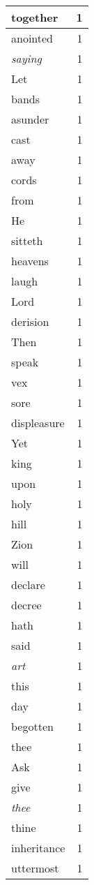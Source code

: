 \begin{center}
\begin{longtable}{l|r}
together & 1 \\ \hline
anointed & 1 \\ \hline
\emph{saying} & 1 \\ \hline
Let & 1 \\ \hline
bands & 1 \\ \hline
asunder & 1 \\ \hline
cast & 1 \\ \hline
away & 1 \\ \hline
cords & 1 \\ \hline
from & 1 \\ \hline
He & 1 \\ \hline
sitteth & 1 \\ \hline
heavens & 1 \\ \hline
laugh & 1 \\ \hline
Lord & 1 \\ \hline
derision & 1 \\ \hline
Then & 1 \\ \hline
speak & 1 \\ \hline
vex & 1 \\ \hline
sore & 1 \\ \hline
displeasure & 1 \\ \hline
Yet & 1 \\ \hline
king & 1 \\ \hline
upon & 1 \\ \hline
holy & 1 \\ \hline
hill & 1 \\ \hline
Zion & 1 \\ \hline
will & 1 \\ \hline
declare & 1 \\ \hline
decree & 1 \\ \hline
hath & 1 \\ \hline
said & 1 \\ \hline
\emph{art} & 1 \\ \hline
this & 1 \\ \hline
day & 1 \\ \hline
begotten & 1 \\ \hline
thee & 1 \\ \hline
Ask & 1 \\ \hline
give & 1 \\ \hline
\emph{thee} & 1 \\ \hline
thine & 1 \\ \hline
inheritance & 1 \\ \hline
uttermost & 1 \\ \hline

\end{longtable}
\end{center}
